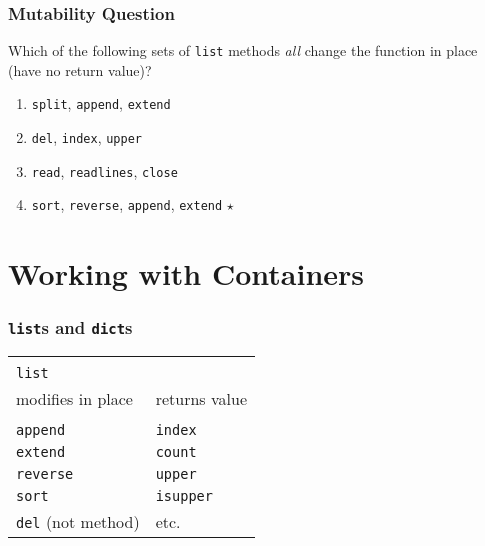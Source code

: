 \documentclass[11pt]{beamer}
\begin{document}
\begin{frame}[fragile]
  \frametitle{Mutability Question}
  \Enlarge

  Which of the following sets of \texttt{list} methods \emph{all} change the function in place (have no return value)?

  \begin{enumerate}[label=\Alph*]
  \item  \texttt{split}, \textcolor{CS101Alt}{\texttt{append}}, \textcolor{CS101Alt}{\texttt{extend}}
  \item  \textcolor{CS101Alt}{\texttt{del}}, \texttt{index}, \texttt{upper}
  \item  \texttt{read}, \texttt{readlines}, \texttt{close}
  \item  \textcolor{CS101Alt}{\texttt{sort}}, \textcolor{CS101Alt}{\texttt{reverse}}, \textcolor{CS101Alt}{\texttt{append}}, \textcolor{CS101Alt}{\texttt{extend}}  $\star$
  \end{enumerate}
\end{frame}

\section{Working with Containers}

\begin{frame}[fragile]
  \frametitle{\texttt{list}s and \texttt{dict}s}
  \Enlarge

  \begin{tabular}{ll}
  \hline\hline \\
  \texttt{list} & \\
  modifies in place \hspace{2cm} & returns value \\
  \hline \\
  \texttt{append} & \texttt{index} \\
  \texttt{extend} & \texttt{count} \\
  \texttt{reverse} & \texttt{upper} \\
  \texttt{sort} & \texttt{isupper} \\
  \texttt{del} (not method) & etc. \\
  \end{tabular}
\end{frame}
\end{document}
